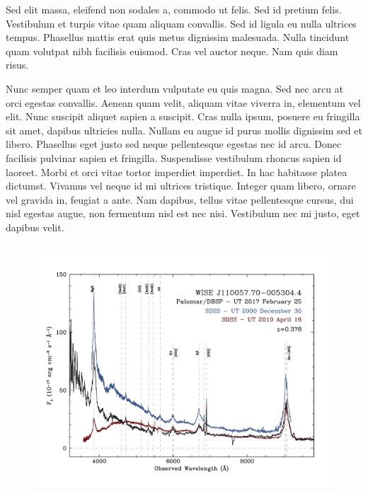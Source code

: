 \documentclass[apj]{emulateapj}
\begin{document}
Sed elit massa, eleifend non sodales a, commodo ut felis. Sed id
pretium felis. Vestibulum et turpis vitae quam aliquam convallis. Sed
id ligula eu nulla ultrices tempus. Phasellus mattis erat quis metus
dignissim malesuada. Nulla tincidunt quam volutpat nibh facilisis
euismod. Cras vel auctor neque. Nam quis diam risus.

Nunc semper quam et leo interdum vulputate eu quis magna. Sed nec arcu
at orci egestas convallis. Aenean quam velit, aliquam vitae viverra
in, elementum vel elit. Nunc suscipit aliquet sapien a suscipit. Cras
nulla ipsum, posuere eu fringilla sit amet, dapibus ultricies
nulla. Nullam eu augue id purus mollis dignissim sed et
libero. Phasellus eget justo sed neque pellentesque egestas nec id
arcu. Donec facilisis pulvinar sapien et fringilla. Suspendisse
vestibulum rhoncus sapien id laoreet. Morbi et orci vitae tortor
imperdiet imperdiet. In hac habitasse platea dictumst. Vivamus vel
neque id mi ultrices tristique. Integer quam libero, ornare vel
gravida in, feugiat a ante. Nam dapibus, tellus vitae pellentesque
cursus, dui nisl egestas augue, non fermentum nisl est nec
nisi. Vestibulum nec mi justo, eget dapibus velit.
\begin{figure}
  \includegraphics[width=17.00cm, height=9.50cm, trim=0.0cm 0.0cm 0.0cm 0.0cm, clip]
  {../plots/spectra/w1100m0052_sdss.jpg}
  \centering
  \caption[]{  } 
\label{fig:w1100m0052_sdss}
\end{figure}
\end{document}
